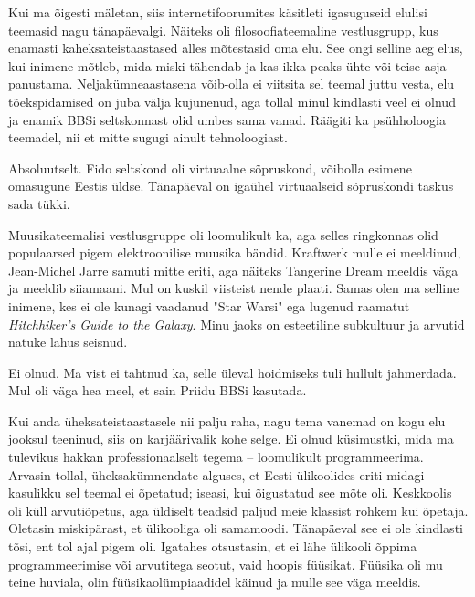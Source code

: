 
\label{sisu!inimeseks}Kui ma õigesti mäletan, siis internetifoorumites 
käsitleti igasuguseid elulisi teemasid nagu tänapäevalgi. 
Näiteks oli filosoofiateemaline vestlusgrupp, kus enamasti 
kaheksateistaastased alles mõtestasid oma elu. See ongi selline aeg 
elus, kui inimene mõtleb, mida miski tähendab ja kas ikka 
peaks ühte või teise asja panustama. Neljakümneaastasena 
võib-olla ei viitsita sel teemal juttu vesta, elu 
tõekspidamised on juba välja kujunenud, aga tollal minul kindlasti veel ei 
olnud ja enamik 
BBSi seltskonnast olid umbes sama vanad. Räägiti ka psühholoogia teemadel, nii 
et mitte sugugi ainult tehnoloogiast. 


Absoluutselt. Fido seltskond oli virtuaalne sõpruskond, võibolla esimene 
omasugune 
Eestis üldse. Tänapäeval on igaühel virtuaalseid sõpruskondi taskus sada tükki.


Muusikateemalisi vestlusgruppe oli loomulikult ka, aga selles ringkonnas olid 
populaarsed pigem elektroonilise muusika bändid.  
Kraftwerk mulle ei meeldinud, Jean-Michel Jarre samuti 
mitte eriti, aga näiteks Tangerine Dream meeldis väga ja meeldib
siiamaani. Mul on kuskil viisteist nende plaati. 
Samas olen ma selline inimene, kes ei ole kunagi vaadanud "Star Warsi" ega 
lugenud raamatut \emph{Hitchhiker's Guide to the Galaxy}. Minu jaoks on 
esteetiline subkultuur ja arvutid natuke lahus seisnud.


Ei olnud. Ma vist ei tahtnud ka, selle üleval hoidmiseks tuli hullult 
jahmerdada. 
Mul oli väga hea meel, et sain Priidu BBSi kasutada.


Kui anda üheksateistaastasele nii palju raha, nagu tema vanemad 
on kogu elu jooksul teeninud, siis on karjäärivalik kohe selge. Ei olnud 
küsimustki, mida ma 
tulevikus hakkan professionaalselt tegema – loomulikult programmeerima. Arvasin 
tollal, 
üheksakümnendate alguses, et Eesti ülikoolides eriti midagi 
kasulikku sel teemal ei õpetatud; iseasi, kui õigustatud see mõte oli. 
Keskkoolis oli küll arvutiõpetus, aga üldiselt 
teadsid paljud meie klassist rohkem kui õpetaja. Oletasin
miskipärast, et ülikooliga oli samamoodi. Tänapäeval see ei ole kindlasti tõsi, 
ent tol ajal pigem oli. 
Igatahes otsustasin, et ei lähe ülikooli õppima 
programmeerimise või arvutitega seotut, vaid hoopis füüsikat. 
Füüsika oli mu teine huviala, olin 
füüsikaolümpiaadidel käinud ja mulle see väga meeldis. 

